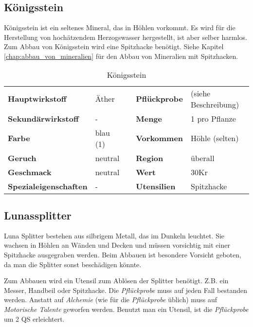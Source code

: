 \subsection{Königsstein}
\label{chap:koenigsstein}
Königsstein ist ein seltenes Mineral, das in Höhlen vorkommt. Es wird für die Herstellung von hochätzendem Herzogswasser hergestellt, ist aber selber harmlos. Zum Abbau von Königsstein wird eine Spitzhacke benötigt. Siehe Kapitel \ref{chap:abbau_von_mineralien} für den Abbau von Mineralien mit Spitzhacken.

\begin{table}[h] 
\begin{center} 
\begin{tabular}{|l|l|p{1cm}|l|l|} 
  	\cline{1-2} \cline{4-5} 
  	\textbf{Hauptwirkstoff} & Äther && \textbf{Pflückprobe} & (siehe Beschreibung) \\ \cline{1-2} \cline{4-5} 
  	\textbf{Sekundärwirkstoff} & - && \textbf{Menge} & 1 pro Pflanze \\ \cline{1-2} \cline{4-5} 
  	\textbf{Farbe} & blau (1) && \textbf{Vorkommen} & Höhle (selten) \\ \cline{1-2} \cline{4-5} 
  	\textbf{Geruch} & neutral && \textbf{Region} & überall \\ \cline{1-2} \cline{4-5} 
  	\textbf{Geschmack} & neutral && \textbf{Wert} & 30Kr \\ \cline{1-2} \cline{4-5} 
  	\textbf{Spezialeigenschaften} & - && \textbf{Utensilien} & Spitzhacke \\ \cline{1-2} \cline{4-5} 
\end{tabular} 
\end{center} 
\caption{Königsstein} 
\label{tab:koenigsstein} 
\end{table}


\subsection{Lunassplitter}
Luna Splitter bestehen aus silbrigem Metall, das im Dunkeln leuchtet. Sie wachsen in Höhlen an Wänden und Decken und müssen vorsichtig mit einer Spitzhacke ausgegraben werden. Beim Abbauen ist besondere Vorsicht geboten, da man die Splitter sonst beschädigen könnte. 

Zum Abbauen wird ein Utensil zum Ablösen der Splitter benötigt. Z.B. ein Messer, Handbeil oder Spitzhacke. Die \textit{Pflückprobe} muss auf jeden Fall bestanden werden. Anstatt auf \textit{Alchemie} (wie für die \textit{Pflückprobe} üblich) muss auf \textit{Motorische Talente} geworfen werden. Benutzt man ein Utensil, ist die \textit{Pflückprobe} um 2 QS erleichtert.

